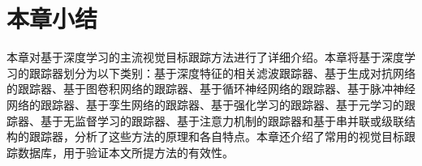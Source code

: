 \section{本章小结}
本章对基于深度学习的主流视觉目标跟踪方法进行了详细介绍。本章将基于深度学习的跟踪器划分为以下类别：基于深度特征的相关滤波跟踪器、基于生成对抗网络的跟踪器、基于图卷积网络的跟踪器、基于循环神经网络的跟踪器、基于脉冲神经网络的跟踪器、基于孪生网络的跟踪器、基于强化学习的跟踪器、基于元学习的跟踪器、基于无监督学习的跟踪器、基于注意力机制的跟踪器和基于串并联或级联结构的跟踪器，分析了这些方法的原理和各自特点。本章还介绍了常用的视觉目标跟踪数据库，用于验证本文所提方法的有效性。